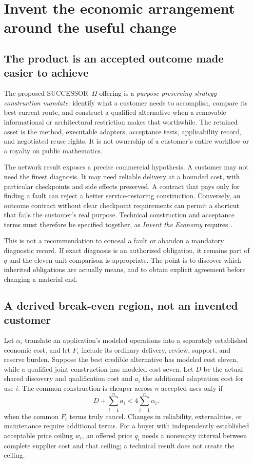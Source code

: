 \documentclass[11pt,letterpaper]{article}
\newcommand{\Om}{SUCCESSOR~$\Omega$}
\theoremstyle{remark}\newtheorem{remark}{Remark}[section]
\begin{document}
\section{Invent the economic arrangement around the useful change}
\label{sec:business}
\subsection{The product is an accepted outcome made easier to achieve}
The proposed \Om{} offering is a \emph{purpose-preserving strategy-construction mandate}: identify what a customer needs to accomplish, compare its best current route, and construct a qualified alternative when a removable informational or architectural restriction makes that worthwhile. The retained asset is the method, executable adapters, acceptance tests, applicability record, and negotiated reuse rights. It is not ownership of a customer's entire workflow or a royalty on public mathematics.

The network result exposes a precise commercial hypothesis. A customer may not need the finest diagnosis. It may need reliable delivery at a bounded cost, with particular checkpoints and side effects preserved. A contract that pays only for finding a fault can reject a better service-restoring construction. Conversely, an outcome contract without clear checkpoint requirements can permit a shortcut that fails the customer's real purpose. Technical construction and acceptance terms must therefore be specified together, as \emph{Invent the Economy} requires \citep{boucherEconomy}.

This is not a recommendation to conceal a fault or abandon a mandatory diagnostic record. If exact diagnosis is an authorized obligation, it remains part of $q$ and the eleven-unit comparison is appropriate. The point is to discover which inherited obligations are actually means, and to obtain explicit agreement before changing a material end.

\subsection{A derived break-even region, not an invented customer}
Let $\alpha_i$ translate an application's modeled operations into a separately established economic cost, and let $F_i$ include its ordinary delivery, review, support, and reserve burden. Suppose the best credible alternative has modeled cost eleven, while a qualified joint construction has modeled cost seven. Let $D$ be the actual shared discovery and qualification cost and $a_i$ the additional adaptation cost for use $i$. The common construction is cheaper across $n$ accepted uses only if
\begin{equation}\label{eq:economics}
D+\sum_{i=1}^n a_i < 4\sum_{i=1}^n\alpha_i,
\end{equation}
when the common $F_i$ terms truly cancel. Changes in reliability, externalities, or maintenance require additional terms. For a buyer with independently established acceptable price ceiling $w_i$, an offered price $q_i$ needs a nonempty interval between complete supplier cost and that ceiling; a technical result does not create the ceiling.
\end{document}
